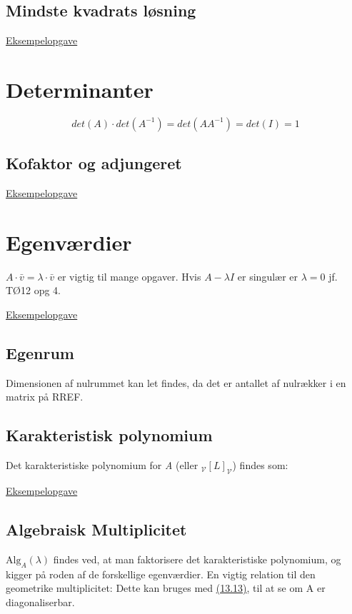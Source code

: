 \documentclass[a4paper,oneside,article]{memoir}
\begin{document}
\section{Mindste kvadrats løsning}
\hyperref[asc:Eksamen 2020 opg 1]{Eksempelopgave}

\chapter{Determinanter} \label{ch:det}
\[det(A)\cdot det(A^{-1}) = det(AA^{-1})=det(I)=1\]

\section{Kofaktor og adjungeret}
\hyperref[asc:Eksamen 2020 opg 4]{Eksempelopgave}

\chapter{Egenværdier} \label{ch:egen}
$A\cdot \bar{v} = λ\cdot \bar{v}$ er vigtig til mange opgaver. Hvis $A-λI$ er singulær er $λ=0$ jf. TØ12 opg 4. 

\hyperref[asc:Eksamen 2023 opg 5]{Eksempelopgave}

\section{Egenrum} \label{sc:erum}
Dimensionen af nulrummet kan let findes, da det er antallet af nulrækker i en matrix på RREF. 

\section{Karakteristisk polynomium} \label{sc:poly}
Det karakteristiske polynomium for \emph{A} (eller $_{\mathcal{V}}[L]_{\mathcal{V}}$) findes som: 


\hyperref[asc:Eksamen 2023 opg 1]{Eksempelopgave}

\section{Algebraisk Multiplicitet} \label{sc:alg}
$\text{Alg}_A(λ)$ findes ved, at man faktorisere det karakteristiske polynomium, og kigger på roden af de forskellige egenværdier. 
En vigtig relation til den geometrike multiplicitet: 
Dette kan bruges med \hyperref[fig:13.13]{(13.13)}, til at se om A er diagonaliserbar. 
\end{document}

